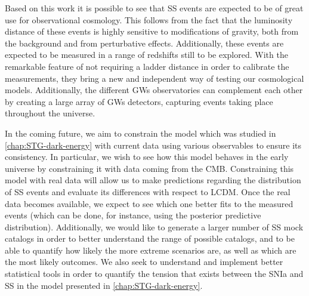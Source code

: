 Based on this work it is possible to see that \gls{SS} events are expected to be of great use for observational cosmology. This follows from the fact that the luminosity distance of these events is highly sensitive to modifications of gravity, both from the background and from perturbative effects. Additionally, these events are expected to be measured in a range of redshifts still to be explored. With the remarkable feature of not requiring a ladder distance in order to calibrate the measurements, they bring a new and independent way of testing our cosmological models. Additionally, the different \glspl{GW} observatories can complement each other by creating a large array of \glspl{GW} detectors, capturing events taking place throughout the universe.

In the coming future, we aim to constrain the model which was studied in \cref{chap:STG-dark-energy} with current data using various observables to ensure its consistency. In particular, we wish to see how this model behaves in the early universe by constraining it with data coming from the \gls{CMB}. Constraining this model with real data will allow us to make predictions regarding the distribution of \gls{SS} events and evaluate its differences with respect to \gls{LCDM}. Once the real data becomes available, we expect to see which one better fits to the measured events (which can be done, for instance, using the posterior predictive distribution). Additionally, we would like to generate a larger number of \gls{SS} mock catalogs in order to better understand the range of possible catalogs, and to be able to quantify how likely the more extreme scenarios are, as well as which are the most likely outcomes. We also seek to understand and implement better statistical tools in order to quantify the tension that exists between the \gls{SNIa} and \gls{SS} in the model presented in \cref{chap:STG-dark-energy}.
